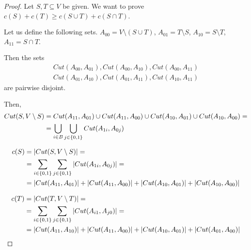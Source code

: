     \begin{proof}
        Let $S,T \subseteq V$ be given. We want to prove $c(S) + c(T) \geq c(S \cup T) + c(S \cap T)$.

        Let us define the following sets.
        $A_{00} = V \setminus (S \cup T)$, $A_{01} = T \setminus S$, $A_{10} = S \setminus T$, $A_{11} = S \cap T$.

        Then the sets
        \begin{equation*}
            \begin{split}
                Cut(A_{00}, A_{01}), Cut(A_{00}, A_{10}), Cut(A_{00}, A_{11})\\
                Cut(A_{01}, A_{10}), Cut(A_{01}, A_{11}), Cut(A_{10}, A_{11})
            \end{split}
        \end{equation*}
        are pairwise disjoint.

        Then,
        \begin{equation*}
            \begin{split}
                Cut(S, V \setminus S)  &= Cut(A_{11}, A_{01}) \cup Cut(A_{11}, A_{00}) \cup Cut(A_{10}, A_{01}) \cup Cut(A_{10}, A_{00}) = \\
                &= \bigcup_{i \in B} \bigcup_{j \in \{ 0,1 \}} Cut(A_{1i}, A_{0j})
            \end{split}
        \end{equation*}

        \begin{equation*}
            \begin{split}
                c(S) &= \vert Cut(S, V \setminus S) \vert =\\
                    &= \sum_{i \in \{ 0,1 \}} \sum_{j \in \{ 0,1 \}} \vert Cut(A_{1i}, A_{0j}) \vert = \\
                    &= \vert Cut(A_{11}, A_{01}) \vert + \vert Cut(A_{11}, A_{00}) \vert + \vert Cut(A_{10}, A_{01}) \vert + \vert Cut(A_{10}, A_{00}) \vert
            \end{split}
        \end{equation*}

        \begin{equation*}
            \begin{split}
                c(T) &= \vert Cut(T, V \setminus T) \vert =\\
                    &= \sum_{i \in \{ 0,1 \}} \sum_{j \in \{ 0,1 \}} \vert Cut(A_{i1}, A_{j0}) \vert = \\
                    &= \vert Cut(A_{11}, A_{10}) \vert + \vert Cut(A_{11}, A_{00}) \vert + \vert Cut(A_{10}, A_{01}) \vert + \vert Cut(A_{01}, A_{00}) \vert
            \end{split}
        \end{equation*}


\end{proof}
